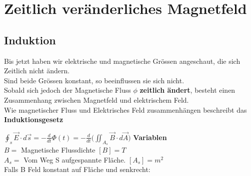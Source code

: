 




\newpage

\section{Zeitlich veränderliches Magnetfeld}

\subsection{Induktion}

Bis jetzt haben wir elektrische und magnetische Grössen angeschaut, die sich Zeitlich nicht ändern. \\
Sind beide Grössen konstant, so beeinflussen sie sich nicht. \\
Sobald sich jedoch der Magnetische Fluss $\phi$  \textbf{zeitlich ändert}, besteht einen Zusammenhang zwischen Magnetfeld und elektrischem Feld. \\
Wie magnetischer Fluss und Elektrisches Feld zusammenhängen beschreibt das \textbf{Induktionsgesetz}


\begingl
\formulaBegin
  $\displaystyle \oint_s \vec{E}\cdot d\vec{s} = -\frac{d}{dt}\Phi(t) =  -\frac{d}{dt} \big ( \iint_{A_s} \vec{B} \cdot d\vec{A} \big )$
\formulaEnd
\textbf{Variablen} \\
$B = $ Magnetische Flussdichte $[B] = T$\\
$A_s = $ Vom Weg S aufgespannte Fläche. $[A_s] = m^2$ \\

Falls B Feld konstant auf Fläche und senkrecht: \\

